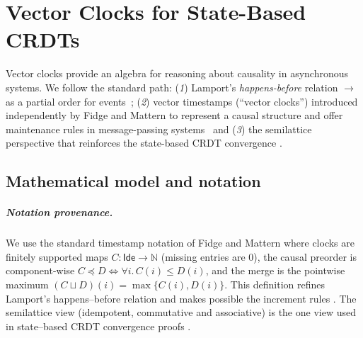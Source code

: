 
\usepackage{xcolor}
\usepackage{listings}


\newcommand{\AthenaCode}[2]{\lstset{style=athena, label={#1}, caption={#2}}}


\chapter{Vector Clocks for State-Based CRDTs}\label{cha:vectors}

Vector clocks provide an algebra for reasoning about causality in asynchronous systems. We follow the standard path: (\emph{1}) Lamport’s \emph{happens-before} relation $\to$ as a partial order for events~\cite{lamport1978time}; (\emph{2}) vector timestamps (``vector clocks'') introduced independently by Fidge and Mattern to represent a causal structure and offer maintenance rules in message-passing systems~\cite{fidge1988timestamps,mattern1989virtual} and (\emph{3}) the semilattice perspective that reinforces the state-based CRDT convergence \cite{shapiro2011conflict}.

\section{Mathematical model and notation}\label{sec:vc-math}

\paragraph{Notation provenance.}
We use the standard timestamp notation of Fidge and Mattern \cite{fidge1988timestamps} where clocks are finitely supported maps $C:\mathsf{Ide}\to\mathbb{N}$ (missing entries are $0$), the causal preorder is component-wise $C\preceq D \iff \forall i.\,C(i)\le D(i)$, and the merge is the pointwise maximum $(C\sqcup D)(i)=\max\{C(i),D(i)\}$. This definition refines Lamport’s happens–before relation and makes possible the increment rules \cite{mattern1989virtual,lamport1978time}. The semilattice view (idempotent, commutative and associative) is the one view used in state–based CRDT convergence proofs \cite{shapiro2011conflict}.

